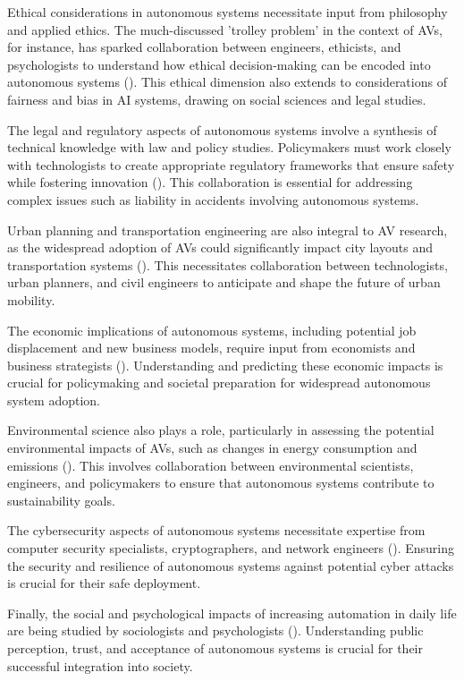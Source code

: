 Ethical considerations in autonomous systems necessitate input from philosophy and applied ethics. The much-discussed 'trolley problem' in the context of AVs, for instance, has sparked collaboration between engineers, ethicists, and psychologists to understand how ethical decision-making can be encoded into autonomous systems (\cite{Awad2018}). This ethical dimension also extends to considerations of fairness and bias in AI systems, drawing on social sciences and legal studies.

The legal and regulatory aspects of autonomous systems involve a synthesis of technical knowledge with law and policy studies. Policymakers must work closely with technologists to create appropriate regulatory frameworks that ensure safety while fostering innovation (\cite{Cummings2021}). This collaboration is essential for addressing complex issues such as liability in accidents involving autonomous systems.

Urban planning and transportation engineering are also integral to AV research, as the widespread adoption of AVs could significantly impact city layouts and transportation systems (\cite{Duarte2018}). This necessitates collaboration between technologists, urban planners, and civil engineers to anticipate and shape the future of urban mobility.

The economic implications of autonomous systems, including potential job displacement and new business models, require input from economists and business strategists (\cite{Autor2015}). Understanding and predicting these economic impacts is crucial for policymaking and societal preparation for widespread autonomous system adoption.

Environmental science also plays a role, particularly in assessing the potential environmental impacts of AVs, such as changes in energy consumption and emissions (\cite{Greenblatt2015}). This involves collaboration between environmental scientists, engineers, and policymakers to ensure that autonomous systems contribute to sustainability goals.

The cybersecurity aspects of autonomous systems necessitate expertise from computer security specialists, cryptographers, and network engineers (\cite{Loukas2018}). Ensuring the security and resilience of autonomous systems against potential cyber attacks is crucial for their safe deployment.

Finally, the social and psychological impacts of increasing automation in daily life are being studied by sociologists and psychologists (\cite{Hancock2020}). Understanding public perception, trust, and acceptance of autonomous systems is crucial for their successful integration into society.

